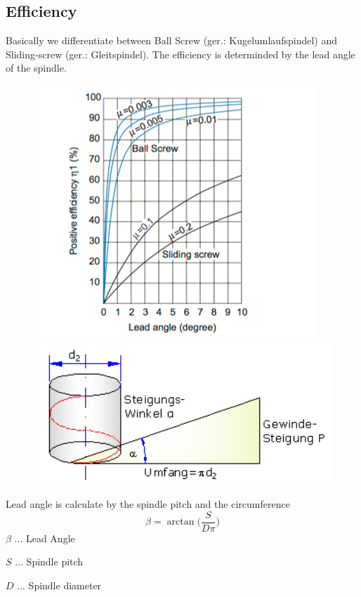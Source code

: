 		\subsection{Efficiency}
			Basically we differentiate between Ball Screw (ger.: Kugelumlaufspindel) and Sliding-screw (ger.: Gleitspindel). The efficiency is determinded by the lead angle of the spindle.
			\begin{figure}[h!]
				\centering
				\includegraphics[width=0.5\linewidth]{./pics/spindle_efficiency.png}
				\includegraphics[width=0.49\linewidth]{./pics/leadanglecalc.png}
			\end{figure}
		
			\begin{tcolorbox}[title=Calculation of spindle lead angle]
				Lead angle is calculate by the spindle pitch and the circumference
				\[\beta=\arctan\bigg(\frac{S}{D\pi}\bigg) \]
				\tcblower
				$ \beta $ ... Lead Angle
				
				$ S $ ... Spindle pitch 
				
				$ D $ ... Spindle diameter
			\end{tcolorbox}	
		
